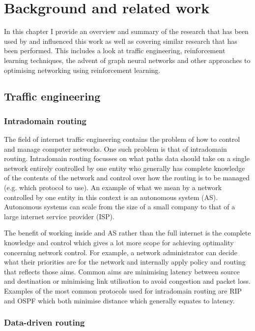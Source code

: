 \chapter{Background and related work}

In this chapter I provide an overview and summary of the research that has been used by and influenced this work as well as covering similar research that has been performed. This includes a look at traffic engineering, reinforcement learning techniques, the advent of graph neural networks and other approaches to optimising networking using reinforcement learning.


\section{Traffic engineering}

\subsection{Intradomain routing}

The field of internet traffic engineering contains the problem of how to control and manage computer networks. One such problem is that of intradomain routing. Intradomain routing focusses on what paths data should take on a single network entirely controlled by one entity who generally has complete knowledge of the contents of the network and control over how the routing is to be managed (e.g. which protocol to use). An example of what we mean by a network controlled by one entity in this context is an autonomous system (AS). Autonomous systems can scale from the size of a small company to that of a large internet service provider (ISP).

The benefit of working inside and AS rather than the full internet is the complete knowledge and control which gives a lot more scope for achieving optimality concerning network control. For example, a network administrator can decide what their priorities are for the network and internally apply policy and routing that reflects those aims. Common aims are minimising latency between source and destination or minimising link utilisation to avoid congestion and packet loss. Examples of the most common protocols used for intradomain routing are RIP\cite{rfc2080} and OSPF\cite{rfc5340} which both minimise distance which generally equates to latency.

\subsection{Data-driven routing}

